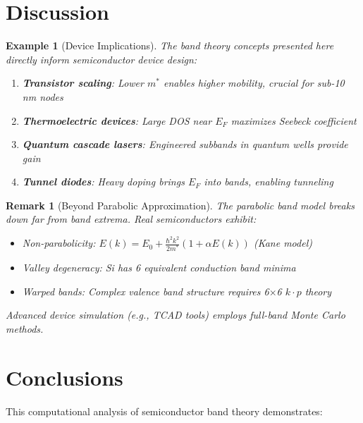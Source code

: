 \documentclass[11pt,a4paper]{article}
\newtheorem{example}{Example}[section]
\newtheorem{remark}{Remark}[section]
\begin{document}
\section{Discussion}

\begin{example}[Device Implications]
The band theory concepts presented here directly inform semiconductor device design:
\begin{enumerate}
\item \textbf{Transistor scaling}: Lower $m^*$ enables higher mobility, crucial for sub-10 nm nodes
\item \textbf{Thermoelectric devices}: Large DOS near $E_F$ maximizes Seebeck coefficient
\item \textbf{Quantum cascade lasers}: Engineered subbands in quantum wells provide gain
\item \textbf{Tunnel diodes}: Heavy doping brings $E_F$ into bands, enabling tunneling
\end{enumerate}
\end{example}

\begin{remark}[Beyond Parabolic Approximation]
The parabolic band model breaks down far from band extrema. Real semiconductors exhibit:
\begin{itemize}
\item Non-parabolicity: $E(k) = E_0 + \frac{\hbar^2 k^2}{2m^*}\left(1 + \alpha E(k)\right)$ (Kane model)
\item Valley degeneracy: Si has 6 equivalent conduction band minima
\item Warped bands: Complex valence band structure requires 6$\times$6 $k \cdot p$ theory
\end{itemize}
Advanced device simulation (e.g., TCAD tools) employs full-band Monte Carlo methods.
\end{remark}

\section{Conclusions}

This computational analysis of semiconductor band theory demonstrates:
\end{document}
